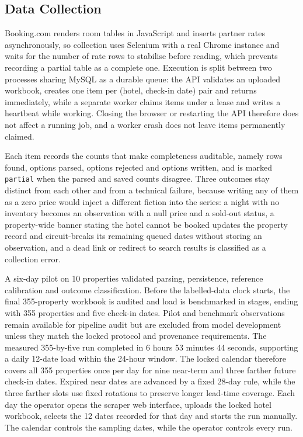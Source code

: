 \subsection{Data Collection}

Booking.com renders room tables in JavaScript and inserts partner rates asynchronously, so collection uses Selenium with a real Chrome instance and waits for the number of rate rows to stabilise before reading, which prevents recording a partial table as a complete one. Execution is split between two processes sharing MySQL as a durable queue: the API validates an uploaded workbook, creates one item per (hotel, check-in date) pair and returns immediately, while a separate worker claims items under a lease and writes a heartbeat while working. Closing the browser or restarting the API therefore does not affect a running job, and a worker crash does not leave items permanently claimed.

Each item records the counts that make completeness auditable, namely rows found, options parsed, options rejected and options written, and is marked \texttt{partial} when the parsed and saved counts disagree. Three outcomes stay distinct from each other and from a technical failure, because writing any of them as a zero price would inject a different fiction into the series: a night with no inventory becomes an observation with a null price and a sold-out status, a property-wide banner stating the hotel cannot be booked updates the property record and circuit-breaks its remaining queued dates without storing an observation, and a dead link or redirect to search results is classified as a collection error.

A six-day pilot on 10 properties validated parsing, persistence, reference calibration and outcome classification. Before the labelled-data clock starts, the final 355-property workbook is audited and load is benchmarked in stages, ending with 355 properties and five check-in dates. Pilot and benchmark observations remain available for pipeline audit but are excluded from model development unless they match the locked protocol and provenance requirements. The measured 355-by-five run completed in 6 hours 53 minutes 44 seconds, supporting a daily 12-date load within the 24-hour window. The locked calendar therefore covers all 355 properties once per day for nine near-term and three farther future check-in dates. Expired near dates are advanced by a fixed 28-day rule, while the three farther slots use fixed rotations to preserve longer lead-time coverage. Each day the operator opens the scraper web interface, uploads the locked hotel workbook, selects the 12 dates recorded for that day and starts the run manually. The calendar controls the sampling dates, while the operator controls every run.

